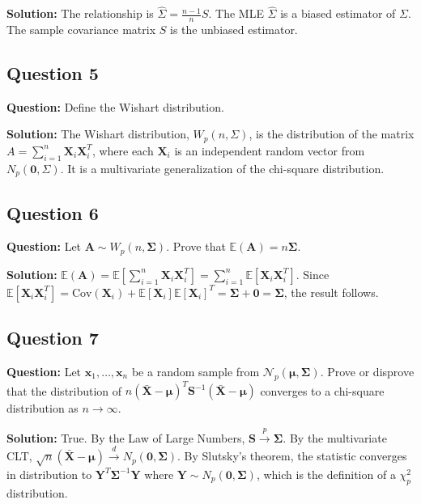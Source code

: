 \textbf{Solution:}
The relationship is $\hat{\Sigma} = \frac{n-1}{n}S$. The MLE $\hat{\Sigma}$ is a biased estimator of $\Sigma$. The sample covariance matrix $S$ is the unbiased estimator.

\subsection*{Question 5}
\textbf{Question:} Define the Wishart distribution.

\textbf{Solution:}
The Wishart distribution, $W_p(n, \Sigma)$, is the distribution of the matrix $A = \sum_{i=1}^n \mathbf{X}_i \mathbf{X}_i^T$, where each $\mathbf{X}_i$ is an independent random vector from $N_p(\mathbf{0}, \Sigma)$. It is a multivariate generalization of the chi-square distribution.

\subsection*{Question 6}
\textbf{Question:} Let $\mathbf{A} \sim W_p(n, \boldsymbol{\Sigma})$. Prove that $\mathbb{E}(\mathbf{A}) = n\boldsymbol{\Sigma}$.

\textbf{Solution:}
$\mathbb{E}(\mathbf{A}) = \mathbb{E}\left[\sum_{i=1}^n \mathbf{X}_i \mathbf{X}_i^T\right] = \sum_{i=1}^n \mathbb{E}[\mathbf{X}_i \mathbf{X}_i^T]$. Since $\mathbb{E}[\mathbf{X}_i \mathbf{X}_i^T] = \text{Cov}(\mathbf{X}_i) + \mathbb{E}[\mathbf{X}_i]\mathbb{E}[\mathbf{X}_i]^T = \boldsymbol{\Sigma} + \mathbf{0} = \boldsymbol{\Sigma}$, the result follows.

\subsection*{Question 7}
\textbf{Question:} Let $\mathbf{x}_1, \dots, \mathbf{x}_n$ be a random sample from $\mathcal{N}_p(\boldsymbol{\mu}, \boldsymbol{\Sigma})$. Prove or disprove that the distribution of $n(\bar{\mathbf{X}} - \boldsymbol{\mu})^T \mathbf{S}^{-1} (\bar{\mathbf{X}} - \boldsymbol{\mu})$ converges to a chi-square distribution as $n \to \infty$.

\textbf{Solution:}
True. By the Law of Large Numbers, $\mathbf{S} \xrightarrow{p} \boldsymbol{\Sigma}$. By the multivariate CLT, $\sqrt{n}(\bar{\mathbf{X}} - \boldsymbol{\mu}) \xrightarrow{d} N_p(\mathbf{0}, \boldsymbol{\Sigma})$. By Slutsky's theorem, the statistic converges in distribution to $\mathbf{Y}^T \boldsymbol{\Sigma}^{-1} \mathbf{Y}$ where $\mathbf{Y} \sim N_p(\mathbf{0}, \boldsymbol{\Sigma})$, which is the definition of a $\chi^2_p$ distribution.


